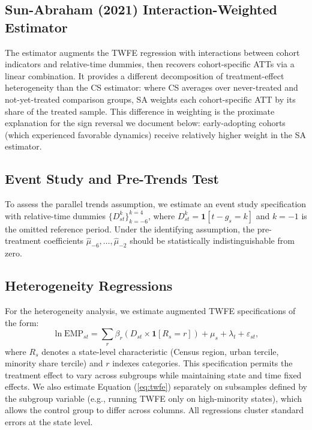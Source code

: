 \documentclass[12pt]{article}
\begin{document}
\subsection{Sun-Abraham (2021) Interaction-Weighted Estimator}

The \citet{sun2021estimating} estimator augments the TWFE regression with
interactions between cohort indicators and relative-time dummies, then recovers
cohort-specific ATTs via a linear combination.  It provides a different
decomposition of treatment-effect heterogeneity than the CS estimator: where
CS averages over never-treated and not-yet-treated comparison groups, SA
weights each cohort-specific ATT by its share of the treated sample.  This
difference in weighting is the proximate explanation for the sign reversal we
document below: early-adopting cohorts (which experienced favorable dynamics)
receive relatively higher weight in the SA estimator.

\subsection{Event Study and Pre-Trends Test}

To assess the parallel trends assumption, we estimate an event study
specification with relative-time dummies $\{D^k_{st}\}_{k=-6}^{k=4}$, where
$D^k_{st} = \mathbf{1}[t - g_s = k]$ and $k = -1$ is the omitted reference
period.  Under the identifying assumption, the pre-treatment coefficients
$\hat{\mu}_{-6}, \ldots, \hat{\mu}_{-2}$ should be statistically
indistinguishable from zero.

\subsection{Heterogeneity Regressions}

For the heterogeneity analysis, we estimate augmented TWFE specifications of
the form:
\begin{equation}
  \ln \text{EMP}_{st} = \sum_{r} \beta_r (D_{st} \times \mathbf{1}[R_s = r])
    + \mu_s + \lambda_t + \varepsilon_{st},
  \label{eq:het}
\end{equation}
where $R_s$ denotes a state-level characteristic (Census region, urban
tercile, minority share tercile) and $r$ indexes categories.  This
specification permits the treatment effect to vary across subgroups while
maintaining state and time fixed effects.  We also estimate Equation
(\ref{eq:twfe}) separately on subsamples defined by the subgroup variable
(e.g., running TWFE only on high-minority states), which allows the control
group to differ across columns.  All regressions cluster standard errors at
the state level.
\end{document}
